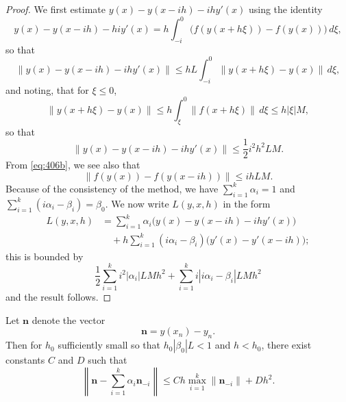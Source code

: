 \begin{proof}
We first estimate $y(x) - y(x - ih) - ihy'(x)$ using the identity
\[
y(x) - y(x - ih) - hiy'(x) = h \int_{-i}^{0} \big( f(y(x + h\xi)) - f(y(x)) \big) \, d\xi,
\]
so that
\[
\| y(x) - y(x - ih) - ihy'(x) \| \leq hL \int_{-i}^{0} \| y(x + h\xi) - y(x) \| \, d\xi,
\]
and noting, that for $\xi \leq 0$,
\[
\| y(x + h\xi) - y(x) \| \leq h \int_{\xi}^{0} \| f(x + h\xi) \| \, d\xi \leq h|\xi|M, \tag{406b}
\]
so that
\[
\| y(x) - y(x - ih) - ihy'(x) \| \leq \frac{1}{2} i^2 h^2 LM.
\]
From \eqref{eq:406b}, we see also that
\[
\| f(y(x)) - f(y(x - ih)) \| \leq ihLM.
\]
Because of the consistency of the method, we have $\sum_{i=1}^{k} \alpha_i = 1$ and $\sum_{i=1}^{k} (i\alpha_i - \beta_i) = \beta_0$. We now write $L(y, x, h)$ in the form
\begin{align*}
L(y, x, h) &= \sum_{i=1}^{k} \alpha_i \big( y(x) - y(x - ih) - ihy'(x) \big) \\
&\quad + h \sum_{i=1}^{k} (i\alpha_i - \beta_i) \big( y'(x) - y'(x - ih) \big);
\end{align*}
this is bounded by
\[
\frac{1}{2} \sum_{i=1}^{k} i^2 |\alpha_i| LM h^2 + \sum_{i=1}^{k} i|i\alpha_i - \beta_i| LM h^2
\]
and the result follows.
\end{proof}

\begin{theorem}

  \label{thm:406C}
Let $\mathbf{n}$ denote the vector
\[
\mathbf{n} = y(x_n) - y_n.
\]
Then for $h_0$ sufficiently small so that $h_0 |\beta_0| L < 1$ and $h < h_0$, there exist constants $C$ and $D$ such that
\[
\left\| \mathbf{n} - \sum_{i=1}^k \alpha_i \mathbf{n}_{-i} \right\| \leq C h \max_{i=1}^k \| \mathbf{n}_{-i} \| + D h^2. \tag{406c}
\]
\end{theorem}

